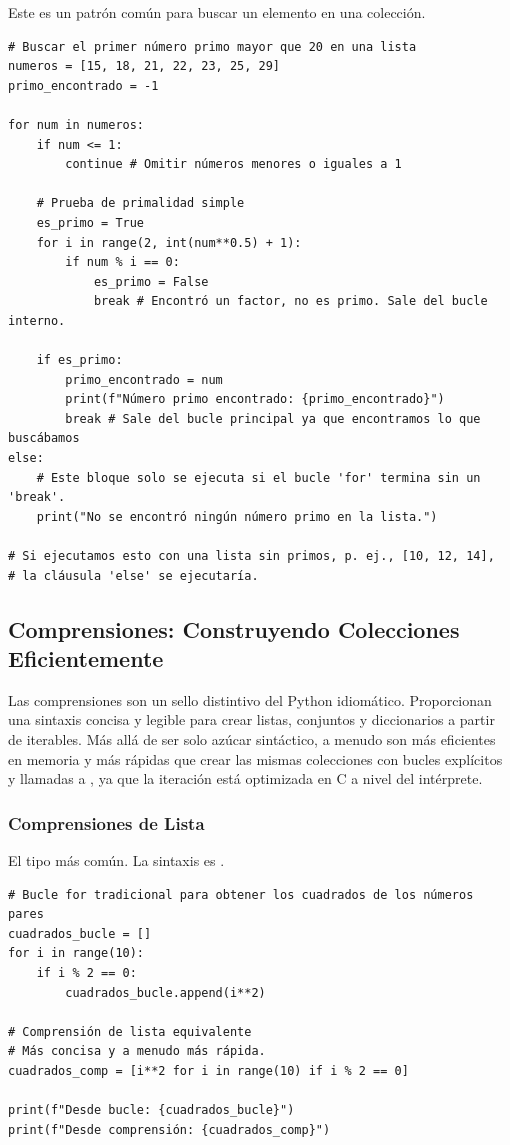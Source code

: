 \begin{example}
Este es un patrón común para buscar un elemento en una colección.
\text{ }\begin{verbatim}
# Buscar el primer número primo mayor que 20 en una lista
numeros = [15, 18, 21, 22, 23, 25, 29]
primo_encontrado = -1

for num in numeros:
    if num <= 1:
        continue # Omitir números menores o iguales a 1

    # Prueba de primalidad simple
    es_primo = True
    for i in range(2, int(num**0.5) + 1):
        if num % i == 0:
            es_primo = False
            break # Encontró un factor, no es primo. Sale del bucle interno.
    
    if es_primo:
        primo_encontrado = num
        print(f"Número primo encontrado: {primo_encontrado}")
        break # Sale del bucle principal ya que encontramos lo que buscábamos
else:
    # Este bloque solo se ejecuta si el bucle 'for' termina sin un 'break'.
    print("No se encontró ningún número primo en la lista.")

# Si ejecutamos esto con una lista sin primos, p. ej., [10, 12, 14],
# la cláusula 'else' se ejecutaría.
\end{verbatim}
\end{example}

\subsection{Comprensiones: Construyendo Colecciones Eficientemente}
\label{subsec:comprehensions}
Las comprensiones son un sello distintivo del Python idiomático. Proporcionan una sintaxis concisa y legible para crear listas, conjuntos y diccionarios a partir de iterables. Más allá de ser solo azúcar sintáctico, a menudo son más eficientes en memoria y más rápidas que crear las mismas colecciones con bucles  explícitos y llamadas a , ya que la iteración está optimizada en C a nivel del intérprete.

\subsubsection*{Comprensiones de Lista}
El tipo más común. La sintaxis es .

\text{ }\begin{verbatim}
# Bucle for tradicional para obtener los cuadrados de los números pares
cuadrados_bucle = []
for i in range(10):
    if i % 2 == 0:
        cuadrados_bucle.append(i**2)

# Comprensión de lista equivalente
# Más concisa y a menudo más rápida.
cuadrados_comp = [i**2 for i in range(10) if i % 2 == 0]

print(f"Desde bucle: {cuadrados_bucle}")
print(f"Desde comprensión: {cuadrados_comp}")
\end{verbatim}

